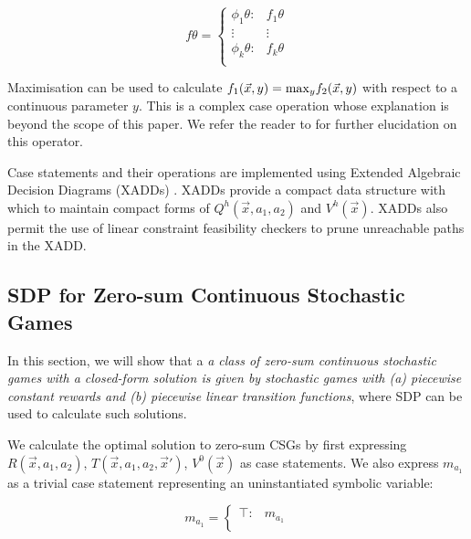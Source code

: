 \vspace{-1.5mm}
{\small 
\abovedisplayshortskip=0pt
\belowdisplayshortskip=0pt
\begin{equation*}
  f\theta = 
    \begin{cases}
      \phi_1\theta: & f_1\theta \\ 
      \vdots & \vdots\\ 
      \phi_k\theta: & f_k\theta \\ 
    \end{cases} \nonumber
\end{equation*}
}%

Maximisation can be used to calculate $f_1(\vec{x}, y) = \mathrm{max}_{y}f_2(\vec{x}, y) $
with respect to a continuous parameter $y$. This is a complex case operation
whose explanation is beyond the scope of this paper. We refer the reader to 
\cite{Zamani_AAAI_2012} for further elucidation on this operator.

Case statements and their operations are implemented using Extended 
Algebraic Decision Diagrams (XADDs) \cite{Sanner_UAI_2011}.
XADDs provide a compact data structure with which to maintain
compact forms of $Q^{h}(\vec{x}, a_1, a_2)$ and $V^{h}(\vec{x})$. 
XADDs also permit the use of linear constraint feasibility checkers to 
prune unreachable paths in the XADD.

\subsection{SDP for Zero-sum Continuous Stochastic Games}

In this section, we will show that a 
{\it a class of zero-sum continuous stochastic games with a
  closed-form solution is given by stochastic games with
(a) piecewise constant rewards and (b) piecewise linear transition
functions}, where SDP can be used to calculate such solutions.

We calculate the optimal solution to zero-sum CSGs by first
expressing $R(\vec{x}, a_1, a_2)$, $T(\vec{x}, a_1, a_2, \vec{x}')$, 
$V^0(\vec{x})$ as case statements. We also express $m_{a_{1}}$
as a trivial case statement representing an uninstantiated symbolic variable:

{\small 
\abovedisplayshortskip=-5pt
\belowdisplayshortskip=0pt
\begin{equation*}
  m_{a_{1}} = 
    \begin{cases}
      \top: & m_{a_{1}} \\ 
    \end{cases} \nonumber
\end{equation*}
}%

